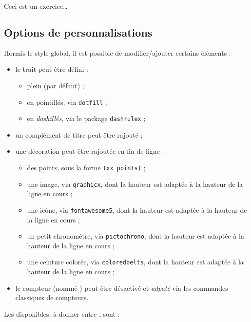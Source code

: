 \documentclass[french,11pt,a4paper]{article}
\begin{document}
\begin{DemoCode}{}
\TitreExo

Ceci est un exercice\ldots
\end{DemoCode}

\subsection{Options de personnalisations}

Hormis le style global, il est possible de modifier/ajouter certains éléments :

\begin{itemize}
	\item le trait peut être défini :
	\begin{itemize}
		\item plein (par défaut) ;
		\item en pointillés, via \texttt{dotfill} ;
		\item en \textit{dashillés}, via le package \texttt{dashrulex} ;
	\end{itemize}
	\item un complément de titre peut être rajouté ;
	\item une décoration peut être rajoutée en fin de ligne :
	\begin{itemize}
		\item des points, sous la forme \texttt{(xx points)} ;
		\item une image, via \texttt{graphicx}, dont la hauteur est adaptée à la hauteur de la ligne en cours ;
		\item une icône, via \texttt{fontawesome5}, dont la hauteur est adaptée à la hauteur de la ligne en cours ;
		\item un petit chronomètre, via \texttt{pictochrono}, dont la hauteur est adaptée à la hauteur de la ligne en cours ;
		\item une ceinture colorée, via \texttt{coloredbelts}, dont la hauteur est adaptée à la hauteur de la ligne en cours ;
	\end{itemize}
	\item le compteur (nommé ) peut être désactivé et \textit{adpaté} via les commandes classiques de compteurs.
\end{itemize}

\pagebreak

Les  disponibles, à donner entre \MontreCode{[...]}, sont :
\end{document}
